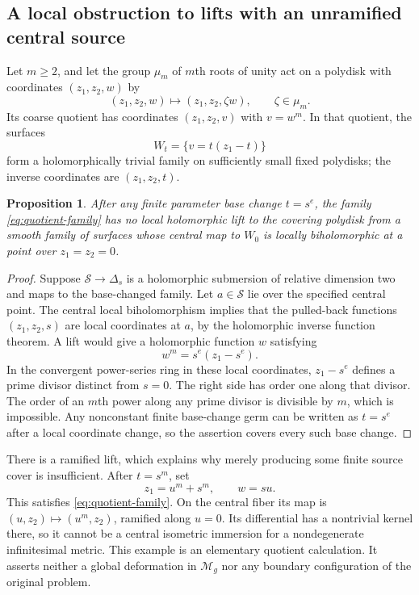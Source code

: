\documentclass[11pt]{article}
\newcommand{\M}{\mathcal M}
\newtheorem{proposition}[theorem]{Proposition}
\theoremstyle{definition}
\theoremstyle{remark}
\begin{document}
\subsection{A local obstruction to lifts with an unramified central source}

Let $m\geq2$, and let the group $\mu_m$ of $m$th roots of unity act on a polydisk with coordinates $(z_1,z_2,w)$ by
\[
 (z_1,z_2,w)\longmapsto(z_1,z_2,\zeta w),\qquad\zeta\in\mu_m.
\]
Its coarse quotient has coordinates $(z_1,z_2,v)$ with $v=w^m$. In that quotient, the surfaces
\begin{equation}\label{eq:quotient-family}
 W_t=\{v=t(z_1-t)\}
\end{equation}
form a holomorphically trivial family on sufficiently small fixed polydisks; the inverse coordinates are $(z_1,z_2,t)$.

\begin{proposition}\label{prop:no-lift}
After any finite parameter base change $t=s^e$, the family \eqref{eq:quotient-family} has no local holomorphic lift to the covering polydisk from a smooth family of surfaces whose central map to $W_0$ is locally biholomorphic at a point over $z_1=z_2=0$.
\end{proposition}

\begin{proof}
Suppose $\mathcal S\to\Delta_s$ is a holomorphic submersion of relative dimension two and maps to the base-changed family. Let $a\in\mathcal S$ lie over the specified central point. The central local biholomorphism implies that the pulled-back functions $(z_1,z_2,s)$ are local coordinates at $a$, by the holomorphic inverse function theorem. A lift would give a holomorphic function $w$ satisfying
\[
 w^m=s^e(z_1-s^e).
\]
In the convergent power-series ring in these local coordinates, $z_1-s^e$ defines a prime divisor distinct from $s=0$. The right side has order one along that divisor. The order of an $m$th power along any prime divisor is divisible by $m$, which is impossible. Any nonconstant finite base-change germ can be written as $t=s^e$ after a local coordinate change, so the assertion covers every such base change.
\end{proof}

There is a ramified lift, which explains why merely producing some finite source cover is insufficient. After $t=s^m$, set
\[
 z_1=u^m+s^m,\qquad w=su.
\]
This satisfies \eqref{eq:quotient-family}. On the central fiber its map is $(u,z_2)\mapsto(u^m,z_2)$, ramified along $u=0$. Its differential has a nontrivial kernel there, so it cannot be a central isometric immersion for a nondegenerate infinitesimal metric. This example is an elementary quotient calculation. It asserts neither a global deformation in $\M_g$ nor any boundary configuration of the original problem.
\end{document}
